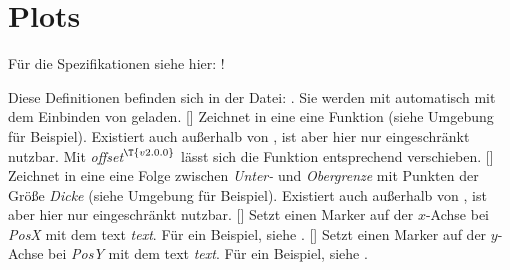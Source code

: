 \section{Plots \tiny{}}
\begin{center}
    Für die Spezifikationen siehe hier: !
\end{center}
Diese Definitionen befinden sich in der Datei: . Sie werden mit  automatisch mit dem Einbinden von  geladen.\medskip\newline
%
%
%
[]
Zeichnet in eine  eine Funktion (siehe Umgebung für Beispiel). Existiert auch außerhalb von , ist aber hier nur eingeschränkt nutzbar. Mit \emph{offset}${}^{\T{v2.0.0}}$ lässt sich die Funktion entsprechend verschieben.\medskip\newline
%
%
%
[\secline{}]
Zeichnet in eine  eine Folge zwischen \emph{Unter-} und \emph{Obergrenze} mit Punkten der Größe \emph{Dicke} (siehe Umgebung für Beispiel). Existiert auch außerhalb von , ist aber hier nur eingeschränkt nutzbar.\medskip\newline
%
%
%
[]
Setzt einen Marker auf der $x$-Achse bei \emph{PosX} mit dem text \emph{text}. Für ein Beispiel, siehe .\medskip\newline
%
%
%
[]
Setzt einen Marker auf der $y$-Achse bei \emph{PosY} mit dem text \emph{text}. Für ein Beispiel, siehe .\medskip\newline






